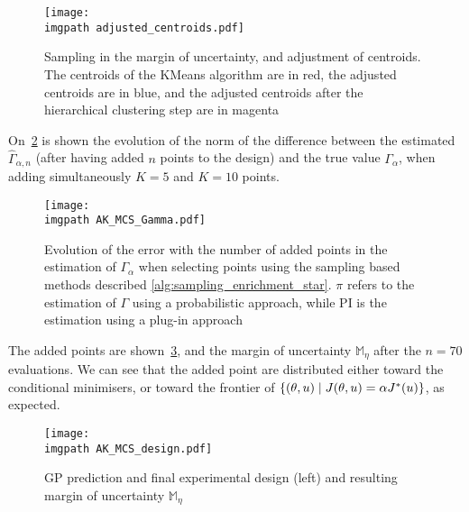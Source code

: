 \documentclass[../../Main_ManuscritThese.tex]{subfiles}
\newcommand\imgpath{/home/victor/acadwriting/Manuscrit/Text/Chapter4/img/}
\begin{document}
\begin{figure}[ht]
  \centering
  \texttt{[image: \\imgpath adjusted\_centroids.pdf]}
  \caption[Full batch iteration with double
  adjustment]{\label{fig:adjusted_centroids} Sampling in the margin of
    uncertainty, and adjustment of centroids. The centroids of the
    KMeans algorithm are in red, the adjusted centroids are in blue,
    and the adjusted centroids after the hierarchical clustering step
    are in magenta}
\end{figure}

On~\cref{fig:AK_MCS_Gamma} is shown the evolution of the norm of the
difference between the estimated $\hat{\Gamma}_{\alpha,n}$ (after
having added $n$ points to the design) and the true value
$\Gamma_{\alpha}$, when adding simultaneously $K=5$ and $K=10$ points.

\begin{figure}[ht]
  \centering
  \texttt{[image: \\imgpath AK\_MCS\_Gamma.pdf]}
  \caption[Error in the estimation of $\Gamma_{\alpha}$ using a
  sampling-based method]{\label{fig:AK_MCS_Gamma} Evolution of the
    error with the number of added points in the estimation of
    $\Gamma_{\alpha}$ when selecting points using the sampling based
    methods described \cref{alg:sampling_enrichment_star}. $\pi$
    refers to the estimation of $\Gamma$ using a probabilistic
    approach, while $\mathrm{PI}$ is the estimation using a plug-in
    approach}
\end{figure}
The added points are shown~\cref{fig:AK_MCS_design}, and the margin of
uncertainty $\mathbb{M}_{\eta}$ after the $n=70$ evaluations. We can
see that the added point are distributed either toward the conditional
minimisers, or toward the frontier of
$\{(\theta, u) \mid J(\theta, u) = \alpha J^*(u)\}$, as expected.
\begin{figure}[ht]
  \centering
  \texttt{[image: \\imgpath AK\_MCS\_design.pdf]}
  \caption{\label{fig:AK_MCS_design} GP prediction and final
    experimental design (left) and resulting margin of uncertainty
    $\mathbb{M}_{\eta}$}
\end{figure}


\end{document}
